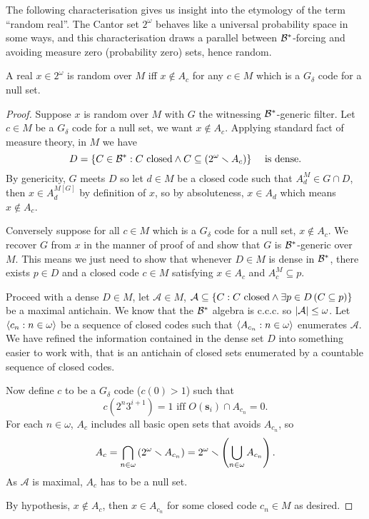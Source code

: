The following characterisation gives us insight into the etymology of the term ``random real''.
The Cantor set \(2^\omega\) behaves like a universal probability space in some ways, and
this characterisation draws a parallel between \({\mathcal{B}}^*\)-forcing and avoiding measure zero (probability zero) sets,
hence random.
\begin{theorem} \label{theorem:bstar_forcing_avoid_null_set}
    A real \(x\in 2^\omega\) is random over \(M\) iff
    \(x\notin A_c\) for any \(c\in M\) which is a \(G_{\delta}\) code for a null set.
\end{theorem}
\begin{proof}
    Suppose \(x\) is random over \(M\) with \(G\) the witnessing \({\mathcal{B}}^*\)-generic filter.
    Let \(c\in M\) be a \(G_\delta\) code for a null set, we want \(x\notin A_c\).
    Applying standard fact of measure theory, in \(M\) we have
    \[ D = {\left\{  C\in{\mathcal{B}}^*: C\text{ closed} \land C\subseteq \left(2^\omega\smallsetminus A_c\right)  \right\}}\quad \text{ is dense.} \]
    By genericity, \(G\) meets \(D\) so let \(d\in M\) be a closed code such that \(A_d^M \in G\cap D\),
    then \(x\in A_d^{M[G]}\) by definition of \(x\),
    so by absoluteness, \(x\in A_d\) which means \(x\notin A_c\).

    Conversely suppose for all \(c\in M\) which is a \(G_\delta\) code for a null set, \(x\notin A_c\).
    We recover \(G\) from \(x\) in the manner of proof of 
    and show that \(G\) is \({\mathcal{B}}^*\)-generic over \(M\).
    This means we just need to show that whenever \(D\in M\) is dense in \({\mathcal{B}}^*\),
    there exists \(p\in D\) and a closed code \(c\in M\) satisfying \(x\in A_c\) and \(A_c^M \subseteq p\).

    Proceed with a dense \(D\in M\), let \(\mathcal{A}\in M\),
    \(\mathcal{A}\subseteq {\left\{ C: C\text{ closed} \land \exists p\in D\left(C\subseteq p\right) \right\}}\)
    be a maximal antichain.
    We know that the \({\mathcal{B}}^*\) algebra is c.c.c. so \(\left\lvert \mathcal{A} \right\rvert \leq \omega\).
    Let \(\left\langle c_n:n \in\omega\right\rangle\) be a sequence of closed codes such that
    \(\left\langle A_{c_n} : n\in \omega \right\rangle\) enumerates \(\mathcal{A}\).
    We have refined the information contained in the dense set \(D\) into something easier to work with,
    that is an antichain of closed sets enumerated by a countable sequence of closed codes.

    Now define \(c\) to be a \(G_\delta\) code (\(c(0) > 1\)) such that
    \[ c(2^n3^{i+1}) = 1 \text{ iff } O(\mathbf{s}_i) \cap A_{c_n} = 0. \]
    For each \(n\in\omega\), \(A_c\) includes all basic open sets that avoids \(A_{c_n}\),
    so \[A_c = \bigcap_{n\in\omega} \left(2^\omega\smallsetminus A_{c_n}\right) = 2^\omega\smallsetminus\left(\bigcup_{n\in\omega} A_{c_n}\right).\]
    As \(\mathcal{A}\) is maximal, \(A_c\) has to be a null set.

    By hypothesis, \(x\notin A_c\), then \(x\in A_{c_n}\) for some closed code \(c_n\in M\) as desired.
\end{proof}


